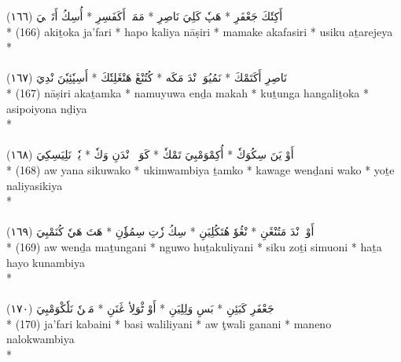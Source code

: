 \documentclass[a4paper, 12pt]{report}
\begin{document}
\begin{center}
\textarabic{(١٦٦) \textcolor{mygreen}{أَكِتٗكَ جَعْفَرِ  * هَپٗ كَلِيَ نَاصِرِ  * مَمَكٖ أَكَفَسِرِ  * أُسِكُ أَتَرٖجٖيَ }} \\* 
(166) akiṯoka ja'fari  * hapo kaliya nāṣiri  * mamake akafasiri  * usiku aṯarejeya  \\* 
 \\ 
\\[8mm] 

\textarabic{(١٦٧) \textcolor{mygreen}{نَاصِرِ أَكَتَمْكَ  * نَمُيُوَ إٖنْدَ مَكَه  * كُتُنْڠَ هَنْڠَلِتٗكَ  * أَسِپٗئِيٗنَ نْدِيَ }} \\* 
(167) nāṣiri akaṯamka  * namuyuwa enḏa makah  * kuṯunga hangaliṯoka  * asipoiyona nḏiya  \\* 
 \\ 
\\[8mm] 

\textarabic{(١٦٨) \textcolor{mygreen}{أَوْ يَنَ سِكُوَكٗ  * أُكِمْوَمْبِيَ تَمْكٗ  * كَوَڠٖ وٖنْدَنِ وَكٗ  * يٗتٖ نَلِيَسِكِيَ }} \\* 
(168) aw yana sikuwako  * ukimwambiya ṯamko  * kawage wenḏani wako  * yoṯe naliyasikiya  \\* 
 \\ 
\\[8mm] 

\textarabic{(١٦٩) \textcolor{mygreen}{أَوْ وٖنْدَ مَتُنْڠَنِ  * نْڠُوٗ هُتَكُلِيَنِ  * سِكُ زٗتِ سِمُؤٗنِ  * هَتَ هَيٗ كُنَمْبِيَ }} \\* 
(169) aw wenḏa maṯungani  * nguwo huṯakuliyani  * siku zoṯi simuoni  * haṯa hayo kunambiya  \\* 
 \\ 
\\[8mm] 

\textarabic{(١٧٠) \textcolor{mygreen}{جَعْفَرِ كَبَئِنِ  * بَسِ وَلِلِيَنِ  * أَوْ ٹْوَلِأ ڠَنَنِ  * مَنٖنٗ نَلٗكْوَمْبِيَ }} \\* 
(170) ja'fari kabaini  * basi waliliyani  * aw ţwali ganani  * maneno nalokwambiya  \\* 
 \\ 
\\[8mm] 


\end{center}
\end{document}
